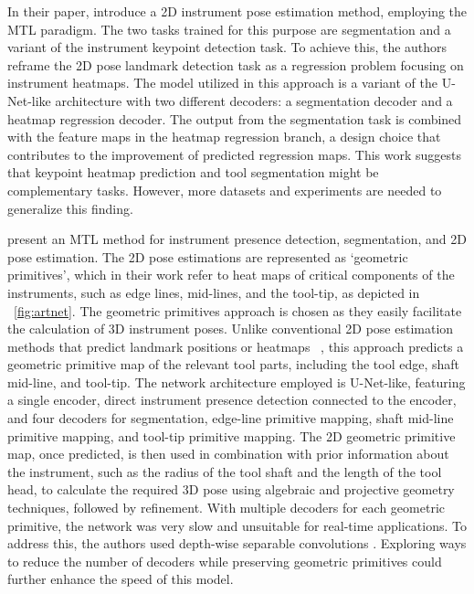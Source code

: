 \documentclass[times,twocolumn,final]{elsarticle}
\newcommand{\figref}[1]{\figurename~\ref{#1}}
\begin{document}
In their paper, \citet{concurrent_segmentation_iro_laina} introduce a 2D instrument pose estimation method, employing the MTL paradigm. The two tasks trained for this purpose are segmentation and a variant of the instrument keypoint detection task. To achieve this, the authors reframe the 2D pose landmark detection task as a regression problem focusing on instrument heatmaps.
The model utilized in this approach is a variant of the U-Net-like architecture with two different decoders: a segmentation decoder and a heatmap regression decoder.  The output from the segmentation task is combined with the feature maps in the heatmap regression branch, a design choice that contributes to the improvement of predicted regression maps. This work suggests that keypoint heatmap prediction and tool segmentation might be complementary tasks. However, more datasets and experiments are needed to generalize this finding.

\citet{art_net} present an MTL method for instrument presence detection, segmentation, and 2D pose estimation. The 2D pose estimations are represented as `geometric primitives', which in their work refer to heat maps of critical components of the instruments, such as edge lines, mid-lines, and the tool-tip, as depicted in  \figref{fig:artnet}. The geometric primitives approach is chosen as they easily facilitate the calculation of 3D instrument poses.
Unlike conventional 2D pose estimation methods that predict landmark positions \citep{multi_semi_pose} or heatmaps ~\citep{concurrent_segmentation_iro_laina}, this approach predicts a geometric primitive map of the relevant tool parts, including the tool edge, shaft mid-line, and tool-tip. The network architecture employed is U-Net-like, featuring a single encoder, direct instrument presence detection connected to the encoder, and four decoders for segmentation, edge-line primitive mapping, shaft mid-line primitive mapping, and tool-tip primitive mapping.
The 2D geometric primitive map, once predicted, is then used in combination with prior information about the instrument, such as the radius of the tool shaft and the length of the tool head, to calculate the required 3D pose using algebraic and projective geometry techniques, followed by refinement. 
With multiple decoders for each geometric primitive, the network was very slow and unsuitable for real-time applications. To address this, the authors used depth-wise separable convolutions \citep{chollet2017xception}. Exploring ways to reduce the number of decoders while preserving geometric primitives could further enhance the speed of this model.
\end{document}
